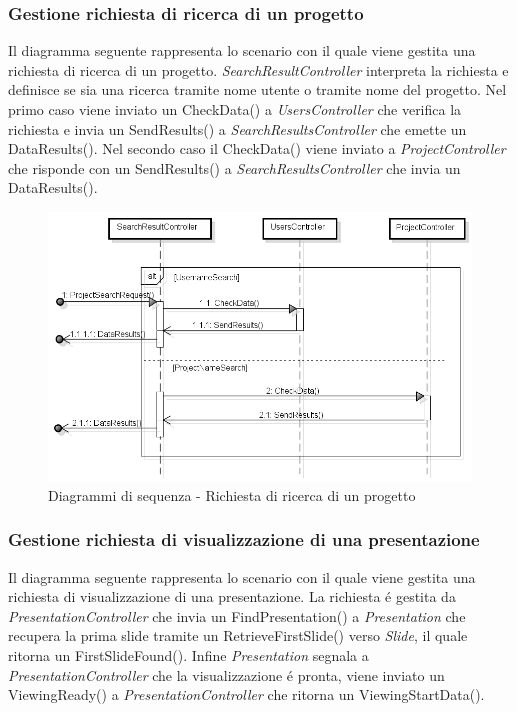 	\subsubsection{Gestione richiesta di ricerca di un progetto}
	Il diagramma seguente rappresenta lo scenario con il quale viene gestita una richiesta di ricerca di un progetto. \textit{SearchResultController} interpreta la richiesta e definisce se sia una ricerca tramite nome utente o tramite nome del progetto. Nel primo caso viene inviato un CheckData() a \textit{UsersController} che verifica la richiesta e invia un SendResults() a \textit{SearchResultsController} che emette un DataResults(). Nel secondo caso il CheckData() viene inviato a \textit{ProjectController} che risponde con un SendResults() a \textit{SearchResultsController} che invia un DataResults().
	\newpage
	\begin{figure}[H]
		\centering
		\includegraphics[scale=0.5]{img/search.png}
		\caption{Diagrammi di sequenza - Richiesta di ricerca di un progetto}
	\end{figure}
	
	\subsubsection{Gestione richiesta di visualizzazione di una presentazione}
	Il diagramma seguente rappresenta lo scenario con il quale viene gestita una richiesta di visualizzazione di una presentazione. La richiesta é gestita da \textit{PresentationController} che invia un FindPresentation() a \textit{Presentation} che recupera la prima \gls{slide} tramite un RetrieveFirstSlide() verso \textit{\gls{Slide}}, il quale ritorna un FirstSlideFound(). Infine \textit{Presentation} segnala a \textit{PresentationController} che la visualizzazione é pronta, viene inviato un ViewingReady() a \textit{PresentationController} che ritorna un ViewingStartData().
	
